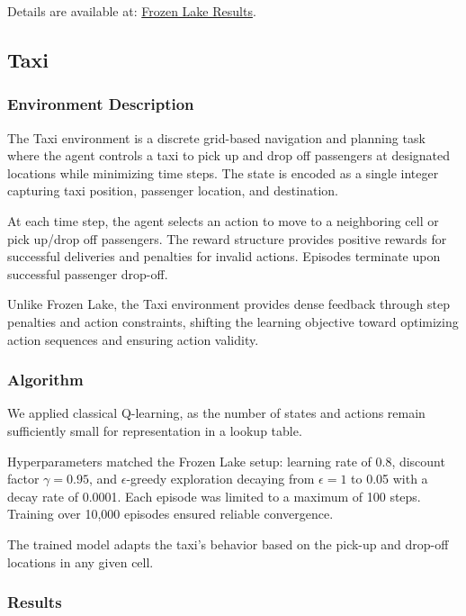 \documentclass[10pt]{article}
\begin{document}
Details are available at:
\href{https://sites.google.com/view/rewardrush-teampiratesofthegym/results/frozen-lake?authuser=0}{Frozen Lake Results}.

\subsection{Taxi}

\vspace{1em}

\subsubsection{Environment Description}
The Taxi environment is a discrete grid-based navigation and planning task where the agent controls a taxi to pick up and drop off passengers at designated locations while minimizing time steps. The state is encoded as a single integer capturing taxi position, passenger location, and destination.

At each time step, the agent selects an action to move to a neighboring cell or pick up/drop off passengers. The reward structure provides positive rewards for successful deliveries and penalties for invalid actions. Episodes terminate upon successful passenger drop-off.

Unlike Frozen Lake, the Taxi environment provides dense feedback through step penalties and action constraints, shifting the learning objective toward optimizing action sequences and ensuring action validity.

\subsubsection{Algorithm}
We applied classical Q-learning, as the number of states and actions remain sufficiently small for representation in a lookup table.

Hyperparameters matched the Frozen Lake setup: learning rate of 0.8, discount factor $\gamma = 0.95$, and $\epsilon$-greedy exploration decaying from $\epsilon = 1$ to 0.05 with a decay rate of 0.0001. Each episode was limited to a maximum of 100 steps. Training over 10,000 episodes ensured reliable convergence.

The trained model adapts the taxi's behavior based on the pick-up and drop-off locations in any given cell.

\subsubsection{Results}
\end{document}
